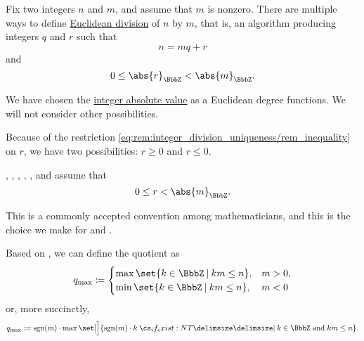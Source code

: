 \begin{remark}\label{rem:integer_division_uniqueness}
  Fix two integers \( n \) and \( m \), and assume that \( m \) is nonzero. There are multiple ways to define \hyperref[def:euclidean_domain]{Euclidean division} of \( n \) by \( m \), that is, an algorithm producing integers \( q \) and \( r \) such that
  \begin{equation*}
    n = mq + r
  \end{equation*}
  and
  \begin{equation}\label{eq:rem:integer_division_uniqueness/rem_inequality}
    0 \leq \abs{r}_\BbbZ < \abs{m}_\BbbZ.
  \end{equation}

  We have chosen the \hyperref[def:integer_absolute_value]{integer absolute value} as a Euclidean degree functions. We will not consider other possibilities.

  Because of the restriction \eqref{eq:rem:integer_division_uniqueness/rem_inequality} on \( r \), we have two possibilities: \( r \geq 0 \) and \( r \leq 0 \).

  \begin{thmenum}
     , , , , ,  and  assume that
    \begin{equation*}
      0 \leq r < \abs{m}_\BbbZ.
    \end{equation*}

    This is a commonly accepted convention among mathematicians, and this is the choice we make for  and \cite{notebook:code}.

    Based on \cite[prop. 1.1]{Knapp2016BasicAlgebra}, we can define the quotient as
    \begin{equation}\label{eq:rem:integer_division_uniqueness/max/q_cases}
      q_{\max} \coloneqq \begin{cases}
        \max\set{ k \in \BbbZ \given km \leq n }, &m > 0, \\
        \min\set{ k \in \BbbZ \given km \leq n }, &m < 0
      \end{cases}
    \end{equation}
    or, more succinctly,
    \begin{equation}\label{eq:rem:integer_division_uniqueness/max/q}
      q_{\max} \coloneqq \sgn(m) \cdot \max\set[\Big]{ \sgn(m) \cdot k \given* k \in \BbbZ \T{and} km \leq n }.
    \end{equation}


\end{thmenum}
\end{remark}
